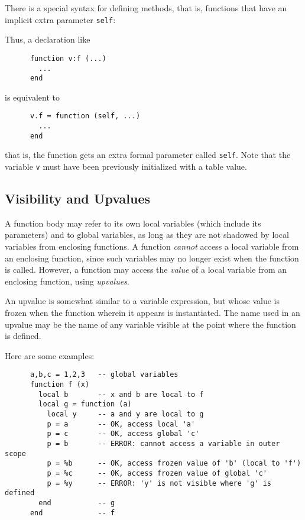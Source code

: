 \documentclass[11pt]{article}
\newcommand{\T}[1]{{\tt #1}}
\newcommand{\Index}[1]{#1\index{#1}}
\newcommand{\IndexVerb}[1]{\T{#1}\index{#1}}
\begin{document}
There is a special syntax for defining \Index{methods},
that is, functions that have an implicit extra parameter \IndexVerb{self}:
\begin{Produc}
\end{Produc}%
Thus, a declaration like
\begin{verbatim}
      function v:f (...)
        ...
      end
\end{verbatim}
is equivalent to
\begin{verbatim}
      v.f = function (self, ...)
        ...
      end
\end{verbatim}
that is, the function gets an extra formal parameter called \verb|self|.
Note that the variable \verb|v| must have been
previously initialized with a table value.


\subsection{Visibility and Upvalues} \label{upvalue}
 

A function body may refer to its own local variables
(which include its parameters) and to global variables,
as long as they are not shadowed by local
variables from enclosing functions.
A function \emph{cannot} access a local
variable from an enclosing function,
since such variables may no longer exist when the function is called.
However, a function may access the \emph{value} of a local variable
from an enclosing function, using \emph{upvalues}.

\begin{Produc}
\end{Produc}
An upvalue is somewhat similar to a variable expression,
but whose value is frozen when the function wherein it
appears is instantiated.
The name used in an upvalue may be the name of any variable visible
at the point where the function is defined.

Here are some examples:
\begin{verbatim}
      a,b,c = 1,2,3   -- global variables
      function f (x)
        local b       -- x and b are local to f
        local g = function (a)
          local y     -- a and y are local to g
          p = a       -- OK, access local 'a'
          p = c       -- OK, access global 'c'
          p = b       -- ERROR: cannot access a variable in outer scope
          p = %b      -- OK, access frozen value of 'b' (local to 'f')
          p = %c      -- OK, access frozen value of global 'c'
          p = %y      -- ERROR: 'y' is not visible where 'g' is defined
        end           -- g
      end             -- f
\end{verbatim}
\end{document}
